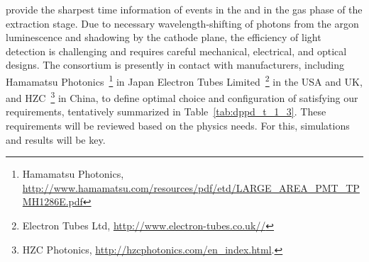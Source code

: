  provide the sharpest time information of events in the \lartpc and in the gas phase of the extraction stage. Due to necessary wavelength-shifting of photons from the argon luminescence and shadowing by the cathode plane, the efficiency of light detection is challenging and requires careful mechanical, electrical, and optical designs. The \dual {} consortium is presently in contact with  manufacturers, including 
%
Hamamatsu Photonics~\footnote{Hamamatsu Photonics\texttrademark{}, \url{http://www.hamamatsu.com/resources/pdf/etd/LARGE_AREA_PMT_TPMH1286E.pdf}} in Japan %
Electron Tubes Limited~\footnote{Electron Tubes Ltd\texttrademark{}, \url{http://www.electron-tubes.co.uk//}} in the USA and UK, and 
HZC~\footnote{HZC Photonics\texttrademark{}, \url{http://hzcphotonics.com/en_index.html}.} in China, 
to define optimal choice and configuration of  satisfying our requirements, tentatively summarized in Table~\ref{tab:dppd_t_1_3}. These requirements will be reviewed based on the physics needs. For this, simulations and  results will be key.

